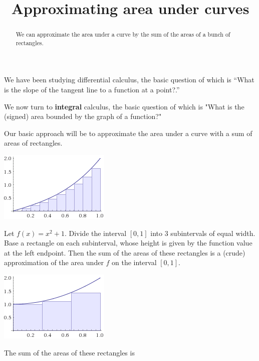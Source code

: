 \documentclass{ximera}
\title{Approximating area under curves}
\begin{document}
\begin{abstract}
	We can approximate the area under a curve by the sum of the areas of a bunch of rectangles.	
\end{abstract}

\maketitle

We have been studying differential calculus, the basic question of
which is ``What is the slope of the tangent line to a function at a
point?.''  

We now turn to \textbf{integral} calculus, the basic
question of which is "What is the (signed) area bounded by the graph
of a function?"

Our basic approach will be to approximate the area under a curve with
a sum of areas of rectangles.

\begin{image}
\includegraphics{riemann0.png}
\end{image}

\begin{question}
  Let $f(x) = x^2+1$.  Divide the interval $[0,1]$ into $3$
  subintervals of equal width.  Base a rectangle on each subinterval,
  whose height is given by the function value at the left endpoint.
  Then the sum of the areas of these rectangles is a (crude)
  approximation of the area under $f$ on the interval $[0,1]$.

\begin{image}
\includegraphics{riemann1.png}
\end{image}
	
  The sum of the areas of these rectangles is 
\end{question}
\end{document}
